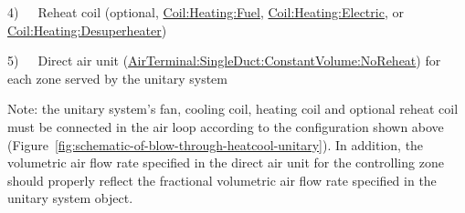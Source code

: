 4)~~~Reheat coil (optional, \hyperref[coilheatinggas-000]{Coil:Heating:Fuel}, \hyperref[coilheatingelectric]{Coil:Heating:Electric}, or \hyperref[coilheatingdesuperheater]{Coil:Heating:Desuperheater})

5)~~~Direct air unit (\hyperref[airterminalsingleductconstantvolumenoreheat]{AirTerminal:SingleDuct:ConstantVolume:NoReheat}) for each zone served by the unitary system

Note: the unitary system's fan, cooling coil, heating coil and optional reheat coil must be connected in the air loop according to the configuration shown above (Figure~\ref{fig:schematic-of-blow-through-heatcool-unitary}). In addition, the volumetric air flow rate specified in the direct air unit for the controlling zone should properly reflect the fractional volumetric air flow rate specified in the unitary system object.

